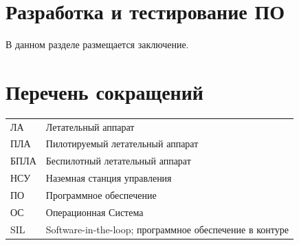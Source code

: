 \documentclass[specification,annotation]{itmo-student-thesis}
\begin{document}
\chapterconclusion

\chapter{Разработка и тестирование ПО}\label{ch:designarch}

\chapterconclusion

\startconclusionpage

В данном разделе размещается заключение.

\printmainbibliography

\appendix

\chapter{Перечень сокращений}\label{sec:app:1}

\begin{table}[!h]
  \centering
  \begin{tabularx}{\textwidth}{L{0.5} L{1.5}}
    \hline
    ЛА & Летательный аппарат \\
    ПЛА & Пилотируемый летательный аппарат \\
    БПЛА & Беспилотный летательный аппарат \\
    НСУ & Наземная станция управления \\
    ПО & Программное обеспечение \\
    ОС & Операционная Система \\
    SIL & Software-in-the-loop; программное обеспечение в контуре \\
    \hline
  \end{tabularx}
\end{table}
\end{document}
